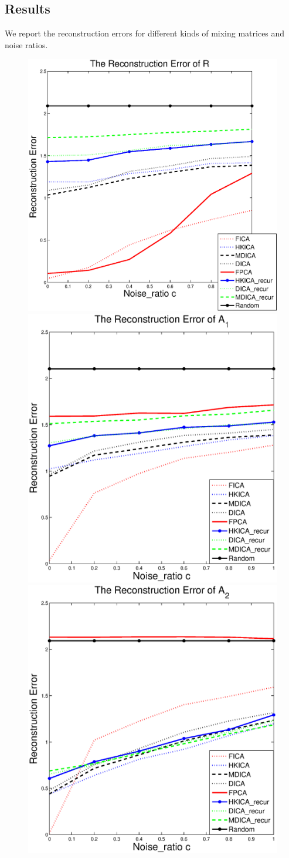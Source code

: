 \documentclass{article}
\theoremstyle{definition}
\begin{document}
\subsection{Results}
\label{subsubsec:results}
We report the reconstruction errors for different kinds of mixing matrices and noise ratios.

\begin{figure}[t] %
	\includegraphics[width =0.49\columnwidth]{errorR}
	\includegraphics[width =0.49\columnwidth]{error1} \medskip \\
	\includegraphics[width =0.49\columnwidth]{error2}

\end{figure}
\end{document}
